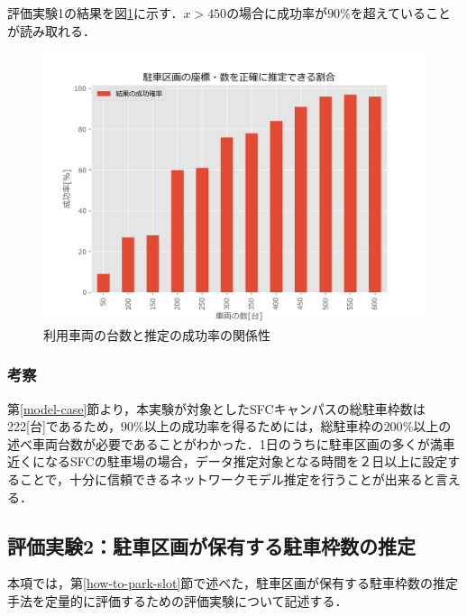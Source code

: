 評価実験1の結果を図\ref{evaluation_test_result_figure}に示す．$x>450$の場合に成功率が$90\%$を超えていることが読み取れる．
\begin{figure}
	\centering
	\includegraphics[width=14cm]{fig/evaluate-result.png}
	\caption{利用車両の台数と推定の成功率の関係性}
	\label{evaluation_test_result_figure}
\end{figure}


\subsubsection{考察}
第\ref{model-case}節より，本実験が対象としたSFCキャンパスの総駐車枠数は222[台]であるため，$90\%$以上の成功率を得るためには，総駐車枠の$200\%$以上の述べ車両台数が必要であることがわかった．1日のうちに駐車区画の多くが満車近くになるSFCの駐車場の場合，データ推定対象となる時間を２日以上に設定することで，十分に信頼できるネットワークモデル推定を行うことが出来ると言える．


\clearpage

\subsection{評価実験2：駐車区画が保有する駐車枠数の推定}
\label{evaluation-test-2}
本項では，第\ref{how-to-park-slot}節で述べた，駐車区画が保有する駐車枠数の推定手法を定量的に評価するための評価実験について記述する．

